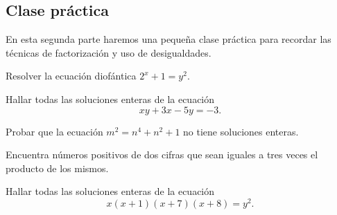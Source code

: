 \subsection{Clase práctica}

En esta segunda parte haremos una pequeña clase práctica para recordar las técnicas de factorización y uso de desigualdades.

\begin{exercise}
    Resolver la ecuación diofántica $2^x + 1 = y^2$.
\end{exercise}

\begin{exercise}
    Hallar todas las soluciones enteras de la ecuación
    \[
        xy + 3x - 5y = -3.
    \]
\end{exercise}

\begin{exercise}
    Probar que la ecuación $m^2 = n^4 + n^2 + 1$ no tiene soluciones enteras.
\end{exercise}

\begin{exercise}
    Encuentra números positivos de dos cifras que sean iguales a tres veces el producto de los mismos.
\end{exercise}

\begin{exercise}
    Hallar todas las soluciones enteras de la ecuación
    \[
        x(x + 1)(x + 7)(x + 8) = y^2.
    \]
\end{exercise}